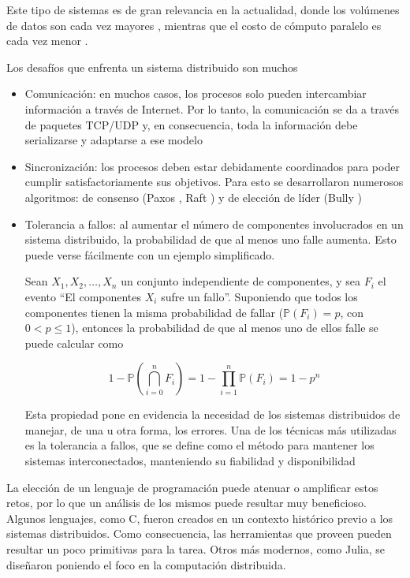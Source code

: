 \documentclass[11pt]{article}
\begin{document}
Este tipo de sistemas es de gran relevancia en la actualidad, donde los volúmenes de datos son cada vez mayores \cite{sis_dist:data_volume}, mientras que el costo de cómputo paralelo es cada vez menor \cite{sis_dist:compute_price}.

Los desafíos que enfrenta un sistema distribuido son muchos

\begin{itemize}
    \item Comunicación: en muchos casos, los procesos solo pueden intercambiar información a través de Internet. Por lo tanto, la comunicación se da a través de paquetes TCP/UDP y, en consecuencia, toda la información debe serializarse y adaptarse a ese modelo
    \item Sincronización: los procesos deben estar debidamente coordinados para poder cumplir satisfactoriamente sus objetivos. Para esto se desarrollaron numerosos algoritmos: de consenso (Paxos \cite{sis_dist:paxos}, Raft \cite{sis_dist:raft}) y de elección de líder (Bully \cite{sis_dist:bully})
    \item Tolerancia a fallos: al aumentar el número de componentes involucrados en un sistema distribuido, la probabilidad de que al menos uno falle aumenta. Esto puede verse fácilmente con un ejemplo simplificado.
    
    Sean $X_1, X_2, \dots, X_n$ un conjunto independiente de componentes, y sea $F_i$ el evento ``El componentes $X_i$ sufre un fallo''. Suponiendo que todos los componentes tienen la misma probabilidad de fallar ($\mathbb{P}(F_i)=p$, con $0<p\leq1$), entonces la probabilidad de que al menos uno de ellos falle se puede calcular como

    \begin{equation}
        1 - \mathbb{P}(\bigcap_{i=0}^n F_i) = 1 - \prod_{i=1}^n \mathbb{P}(F_i) = 1 - p^n
    \end{equation}

    Esta propiedad pone en evidencia la necesidad de los sistemas distribuidos de manejar, de una u otra forma, los errores. Una de los técnicas más utilizadas es la tolerancia a fallos, que se define como el método para mantener los sistemas interconectados, manteniendo su fiabilidad y disponibilidad \cite{sis_dist:fault_tol}
\end{itemize}

La elección de un lenguaje de programación puede atenuar o amplificar estos retos, por lo que un análisis de los mismos puede resultar muy beneficioso. Algunos lenguajes, como C, fueron creados en un contexto histórico previo a los sistemas distribuidos. Como consecuencia, las herramientas que proveen pueden resultar un poco primitivas para la tarea. Otros más modernos, como Julia, se diseñaron poniendo el foco en la computación distribuida.
\end{document}
